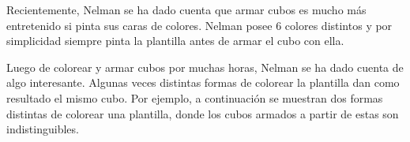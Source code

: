 \documentclass{oci}
\begin{document}
\begin{problemDescription}
\begin{center}
\begin{tikzpicture}[scale = 0.8]



\end{tikzpicture}
\end{center}

Recientemente, Nelman se ha dado cuenta que armar cubos es mucho más entretenido si pinta sus caras
de colores.
Nelman posee 6 colores distintos y por simplicidad siempre pinta la plantilla antes de armar el cubo
con ella.

Luego de colorear y armar cubos por muchas horas, Nelman se ha dado cuenta de algo interesante.
Algunas veces distintas formas de colorear la plantilla dan como resultado el mismo cubo.
Por ejemplo, a continuación se muestran dos formas distintas de colorear una plantilla, donde los cubos
armados a partir de estas son indistinguibles.


\end{problemDescription}
\end{document}
